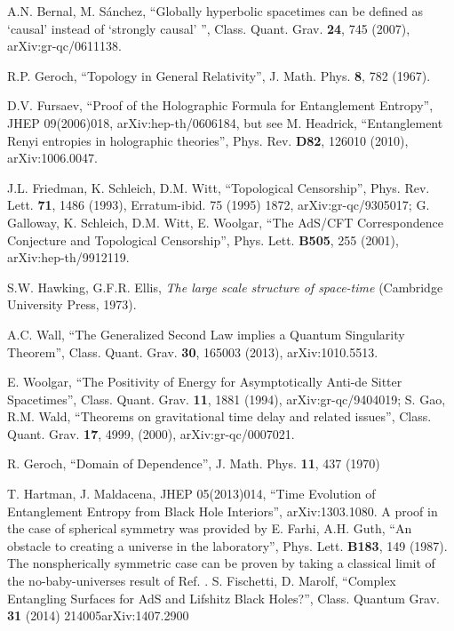 \documentclass[12pt]{article}
\begin{document}
\begin{thebibliography}{99}
A.N. Bernal, M. S\'{a}nchez, ``Globally hyperbolic spacetimes can be defined as 
`causal' instead of `strongly causal' '', Class. Quant. Grav. \textbf{24}, 745 (2007), arXiv:gr-qc/0611138. 

R.P. Geroch, ``Topology in General Relativity'', J. Math. Phys. \textbf{8}, 782 (1967).

D.V. Fursaev, ``Proof of the Holographic Formula for Entanglement Entropy'', JHEP 09(2006)018, arXiv:hep-th/0606184, but see 
M. Headrick, ``Entanglement Renyi entropies in holographic theories'', Phys. Rev. \textbf{D82}, 126010 (2010), 	arXiv:1006.0047.

J.L. Friedman, K. Schleich, D.M. Witt, ``Topological Censorship'', Phys. Rev. Lett. \textbf{71}, 1486 (1993), Erratum-ibid. 75 (1995) 1872, arXiv:gr-qc/9305017; G. Galloway, K. Schleich, D.M. Witt, E. Woolgar, ``The AdS/CFT Correspondence Conjecture and Topological Censorship'', Phys. Lett. \textbf{B505}, 255 (2001), arXiv:hep-th/9912119.

S.W. Hawking, G.F.R. Ellis, \textit{The large scale structure of space-time} (Cambridge University Press, 1973).

A.C. Wall, ``The Generalized Second Law implies a Quantum Singularity Theorem'', Class. Quant. Grav. \textbf{30}, 165003 (2013), arXiv:1010.5513.

E. Woolgar, ``The Positivity of Energy for Asymptotically Anti-de Sitter Spacetimes'', Class. Quant. Grav. \textbf{11}, 1881 (1994),  arXiv:gr-qc/9404019;
S. Gao, R.M. Wald, ``Theorems on gravitational time delay and related issues'',  Class. Quant. Grav. \textbf{17}, 4999, (2000), arXiv:gr-qc/0007021.


R. Geroch, ``Domain of Dependence'', J. Math. Phys. \textbf{11}, 437 (1970)

T. Hartman, J. Maldacena, JHEP 05(2013)014, ``Time Evolution of Entanglement Entropy from Black Hole Interiors'', 
arXiv:1303.1080.
A proof in the case of spherical symmetry was provided by E. Farhi, A.H. Guth, ``An obstacle to creating a universe in the laboratory'', Phys. Lett. \textbf{B183}, 149 (1987).  The nonspherically symmetric case can be proven by taking a classical limit of the no-baby-universes result of Ref. \cite{sing}.
S. Fischetti, D. Marolf, ``Complex Entangling Surfaces for AdS and Lifshitz Black Holes?'', Class. Quantum Grav. \textbf{31} (2014) 214005arXiv:1407.2900


\end{thebibliography}
\end{document}
